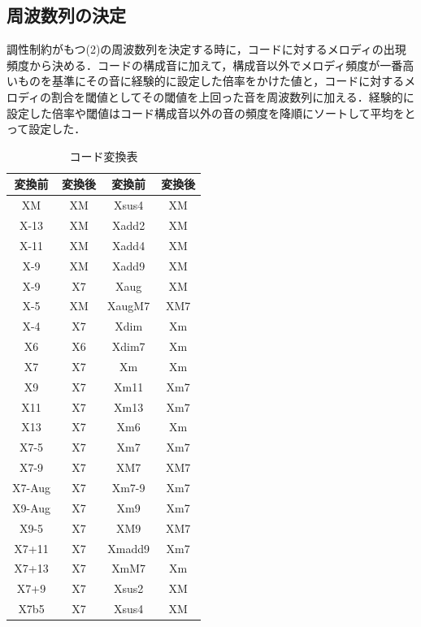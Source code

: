\subsection{周波数列の決定}
調性制約がもつ(2)の周波数列を決定する時に，コードに対するメロディの出現頻度から決める．コードの構成音に加えて，構成音以外でメロディ頻度が一番高いものを基準にその音に経験的に設定した倍率をかけた値と，コードに対するメロディの割合を閾値としてその閾値を上回った音を周波数列に加える．経験的に設定した倍率や閾値はコード構成音以外の音の頻度を降順にソートして平均をとって設定した．
 \begin{table}[t]
     \caption{コード変換表}
     \begin{center}
         \begin{tabular}{ | c | c || c | c | } \hline
         	変換前 & 変換後 & 変換前 & 変換後 \\ \hline \hline
			XM & XM &Xsus4 & XM \\ \hline
			X-13 & XM & Xadd2 & XM \\ \hline
			X-11 & XM & Xadd4 & XM \\ \hline
			X-9 & XM & Xadd9 & XM \\ \hline
			X-9 & X7 & Xaug & XM \\ \hline
			X-5 & XM & XaugM7 & XM7 \\ \hline
			X-4 & X7 & Xdim & Xm \\ \hline
			X6 & X6 & Xdim7 & Xm \\ \hline
			X7 & X7 & Xm & Xm \\ \hline
			X9 & X7 & Xm11 & Xm7 \\ \hline
			X11 & X7 & Xm13 & Xm7 \\ \hline
			X13 & X7 & Xm6 & Xm \\ \hline
			X7-5 & X7 & Xm7 & Xm7 \\ \hline
			X7-9 & X7 & XM7 & XM7 \\ \hline
			X7-Aug & X7 & Xm7-9 & Xm7\\ \hline
			X9-Aug & X7 & Xm9 & Xm7 \\ \hline
			X9-5 & X7 & XM9 & XM7 \\ \hline
			X7+11 & X7 & Xmadd9 & Xm7 \\ \hline
			X7+13 & X7 & XmM7 & Xm \\ \hline
			X7+9 & X7 & Xsus2 & XM \\ \hline
			X7b5 & X7& Xsus4 & XM \\ \hline
         \end{tabular}
         \label{tab:convert}
     \end{center}
 \end{table}
 
